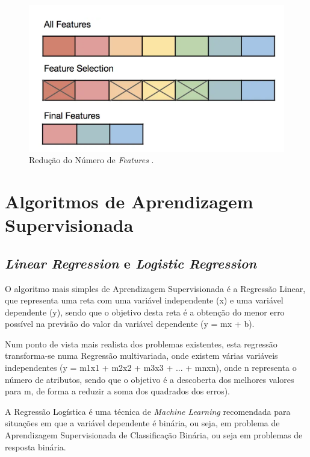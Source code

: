 \documentclass[12pt,a4paper,twoside]{report}
\begin{document}
{\begin{figure}[H]
    \centering
    \includegraphics[width=1\textwidth]{imagens/FeatureSelection.png}
    \caption{Redução do Número de \textit{Features} \cite{automated-feature-selection}.}
    \label{fig:featureSelection}
\end{figure}

\section{Algoritmos de Aprendizagem Supervisionada}

\subsection{\textit{Linear Regression} e \textit{Logistic Regression}}

O algoritmo mais simples de Aprendizagem Supervisionada é a Regressão Linear, que representa uma reta com uma variável independente (x) e uma variável dependente (y), sendo que o objetivo desta reta é a obtenção do menor erro possível na previsão do valor da variável dependente (y = mx + b).

Num ponto de vista mais realista dos problemas existentes, esta regressão transforma-se numa Regressão multivariada, onde existem várias variáveis independentes (y = m1x1 + m2x2 + m3x3 + ... + mnxn), onde n representa o número de atributos, sendo que o objetivo é a descoberta dos melhores valores para m, de forma a reduzir a soma dos quadrados dos erros).

A Regressão Logística é uma técnica de \textit{Machine Learning} recomendada para situações em que a variável dependente é binária, ou seja, em problema de Aprendizagem Supervisionada de Classificação Binária, ou seja em problemas de resposta binária.

}
\end{document}
